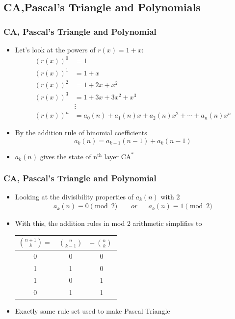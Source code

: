 \documentclass{beamer}
\begin{document}
\subsection{CA,Pascal's Triangle and Polynomials}
\begin{frame}
    \frametitle{CA, Pascal's Triangle and Polynomial}
    \begin{itemize}
        \item Let's look at the powers of $r(x) = 1 + x$:
        \begin{align*}
            (r(x))^{0} &=1 \\
            (r(x))^{1} &=1+x \\
            (r(x))^{2} &=1+2 x+x^{2} \\
            (r(x))^{3} &=1+3 x+3 x^{2}+x^{3} \\ & \vdots \\
            (r(x))^{n} &=a_{0}(n)+a_{1}(n) x+a_{2}(n) x^{2}+\cdots+a_{n}(n) x^{n} 
        \end{align*}
        \item By the addition rule of binomial coefficients
        \begin{equation*}
            a_k(n) = a_{k-1}(n-1) + a_k(n-1)
        \end{equation*}
        \item $a_k(n)$ gives the state of $\text{n}^{\text{th}}$ layer $\text{CA}^*$ 
    \end{itemize}
\end{frame}
\begin{frame}
    \frametitle{CA, Pascal's Triangle and Polynomial}
    \begin{itemize}
        \item Looking at the divisibility properties of $a_k(n)$ with 2
        \begin{align*}
            a_k(n) \equiv 0 \pmod 2  \qquad or&& a_k(n) \equiv 1 \pmod 2
        \end{align*}
        \item With this, the addition rules in mod 2 arithmetic simplifies to
        \begin{table}
            \centering
            \begin{tabular}{|ccc|}
                \hline
                $\binom{n+1}{k} =$ & $\binom{n}{k-1}$& $+ \ \binom{n}{k} \ $\\
                \hline
                0 & 0 & 0 \\
                1 & 1 & 0 \\
                1 & 0 & 1 \\
                0 & 1 & 1 \\
                \hline
            \end{tabular}
        \end{table}
        \item Exactly same rule set used to make Pascal Triangle
    \end{itemize}
\end{frame}
\end{document}
